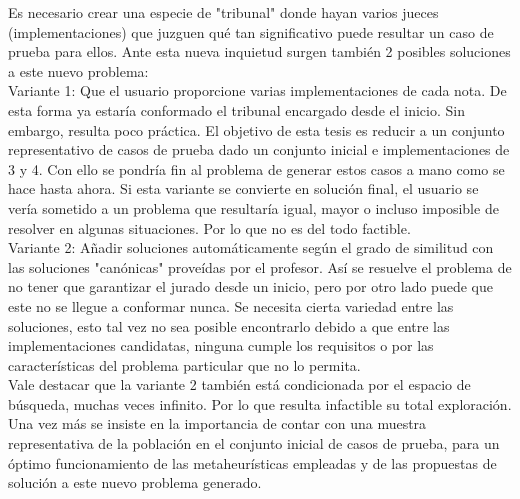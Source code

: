 \documentclass[a4paper,12pt]{book}
\begin{document}
	Es necesario crear una especie de "tribunal" donde hayan varios jueces (implementaciones) que juzguen qué tan significativo puede resultar un caso de prueba para ellos. Ante esta nueva inquietud surgen también 2 posibles soluciones a este nuevo problema: \\
	
 	Variante 1: Que el usuario proporcione varias implementaciones de cada nota. De esta forma ya estaría conformado el tribunal encargado desde el inicio. Sin embargo, resulta poco práctica. El objetivo de esta tesis es reducir a un conjunto representativo de casos de prueba dado un conjunto inicial e implementaciones de 3 y 4. Con ello se pondría fin al problema de generar estos casos a mano como se hace hasta ahora. Si esta variante se convierte en solución final, el usuario se vería sometido a un problema que resultaría igual, mayor o incluso imposible de resolver en algunas situaciones. Por lo que no es del todo factible. \\
	
	Variante 2: Añadir soluciones automáticamente según el grado de similitud con las soluciones "canónicas" proveídas por el profesor. Así se resuelve el problema de no tener que garantizar el jurado desde un inicio, pero por otro lado puede que este no se llegue a conformar nunca. Se necesita cierta variedad entre las soluciones, esto tal vez no sea posible encontrarlo debido a que entre las implementaciones candidatas, ninguna cumple los requisitos o por las características del problema particular que no lo permita. \\
	
	Vale destacar que la variante 2 también está condicionada por el espacio de búsqueda, muchas veces infinito. Por lo que resulta infactible su total exploración. Una vez más se insiste en la importancia de contar con una muestra representativa de la población en el conjunto inicial de casos de prueba, para un óptimo funcionamiento de las metaheurísticas empleadas y de las propuestas de solución a este nuevo problema generado.
	
	

	



\end{document}
